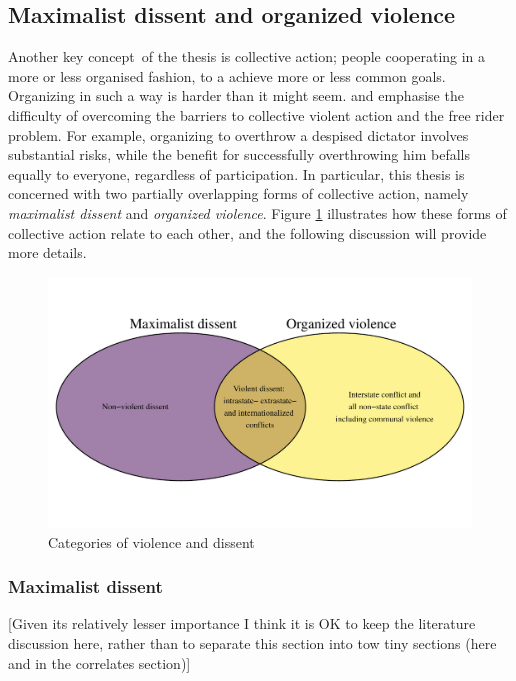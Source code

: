 \subsection{Maximalist dissent and organized violence}
\label{Maximalist dissent and organized violence}

Another key concept of the thesis is collective action; people cooperating in a
more or less organised fashion, to a achieve more or less common goals.
Organizing in such a way is harder than it might seem.
\citet{OlsonMancur1965TLoC} and \citet{Tullock_1971} emphasise the difficulty of
overcoming the barriers to collective violent action and the free rider problem.
For example, organizing to overthrow a despised dictator involves substantial
risks, while the benefit for successfully overthrowing him befalls equally to
everyone, regardless of participation. In particular, this thesis is concerned
with two partially overlapping forms of collective action, namely
\textit{maximalist dissent} and \textit{organized violence}. Figure \ref{venn}
illustrates how these forms of collective action relate to each other, and the
following discussion will provide more details.

\begin{figure}[hpbt]
	\centering
	\includegraphics[width=\textwidth]{../R/Output/venn.pdf}
	\caption{Categories of violence and dissent}
	\label{venn}
\end{figure}

\subsubsection{Maximalist dissent} \label{Maximalist dissent}

[Given its relatively lesser importance I think it is OK to keep the literature
discussion here, rather than to separate this section into tow tiny sections
(here and in the correlates section)]

